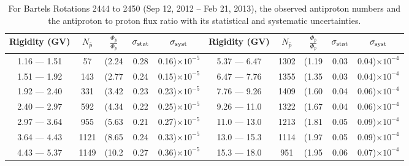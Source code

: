 \begin{table}[p] 
\renewcommand\baselinestretch{1.3}\selectfont
\setlength\tabcolsep{3pt}
\centering
\begin{tabular}{ccccc | ccccc}
\hline
\textbf{Rigidity}  (GV)  & $N_{\bar{p}}$ & $\frac{\Phi_{\bar{p}}}{\Phi_{p}}$ & $\sigma_{\rm{stat}}$ & $\sigma_{\rm{syst}}$ \hspace{1cm}   & \textbf{Rigidity}  (GV)  & $N_{\bar{p}}$ & $\frac{\Phi_{\bar{p}}}{\Phi_{p}}$ & $\sigma_{\rm{stat}}$ & $\sigma_{\rm{syst}}$ \hspace{1cm} \\ 
\hline
1.16 — 1.51   &  57                  &(2.24                          &  0.28              &      0.16)$\times 10^{-5}$  & 5.37 — 6.47                &  1302                    &(1.19                                &  0.03                   &      0.04)$\times 10^{-4}$\\
1.51 — 1.92   &  143                &(2.77                          &  0.24              &      0.15)$\times 10^{-5}$  & 6.47 — 7.76                &  1355                    &(1.35                                &  0.03                   &      0.04)$\times 10^{-4}$\\
1.92 — 2.40   &  331                &(3.42                          &  0.23              &      0.23)$\times 10^{-5}$  & 7.76 — 9.26                &  1409                    &(1.60                                &  0.04                   &      0.06)$\times 10^{-4}$\\    
2.40 — 2.97   &  592                &(4.34                          &  0.22              &      0.25)$\times 10^{-5}$  & 9.26 — 11.0                &  1322                    &(1.67                                &  0.04                   &      0.06)$\times 10^{-4}$\\    
2.97 — 3.64   &  955                &(5.63                          &  0.21              &      0.27)$\times 10^{-5}$  & 11.0 — 13.0                 &  1213                    &(1.81                                &  0.05                   &      0.09)$\times 10^{-4}$\\
3.64 — 4.43   &  1121              &(8.65                          &  0.24              &      0.33)$\times 10^{-5}$  & 13.0 — 15.3               &  1114                    &(1.97                                &  0.05                   &      0.09)$\times 10^{-4}$\\
4.43 — 5.37   &  1149              &(10.2                          &  0.27              &      0.36)$\times 10^{-5}$  & 15.3 — 18.0               &  951                     &(1.95                               &  0.06                     &      0.07)$\times 10^{-4}$\\
\hline
\end{tabular}
\caption[Antiproton to proton flux ratio for Bartels Rotations 2444 to 2450]{For Bartels Rotations 2444 to 2450 (Sep 12, 2012 – Feb 21, 2013), the observed antiproton numbers and the antiproton to proton flux ratio with its statistical and systematic uncertainties.}
\label{TableOfDependent4}
\end{table}

